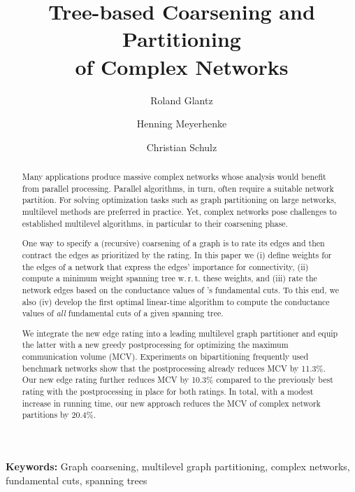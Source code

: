\documentclass[pdftex]{llncs}
\newcommand{\wrt}{w.\,r.\,t.\xspace}
\numberwithin{equation}{section}
\numberwithin{example}{section}
\numberwithin{table}{section}
\begin{document}
\date{}


\title{Tree-based Coarsening and Partitioning \\ of Complex Networks}


\author{Roland Glantz \and Henning Meyerhenke \and Christian Schulz}

\maketitle
\vspace{-4mm}
\begin{abstract}
Many applications produce massive complex networks whose
  analysis would benefit from parallel processing.  Parallel
  algorithms, in turn, often require a suitable network partition.  For solving optimization tasks such as
  graph partitioning on large networks, multilevel methods are
  preferred in practice. Yet, complex networks pose  challenges to
  established multilevel algorithms, in particular to their coarsening
  phase.  

One way to specify a (recursive) coarsening of a graph is to
  rate its edges and then contract the edges as prioritized by the
  rating.  In this paper we (i) define weights for the edges of a
  network that express the edges' importance for connectivity, (ii)
  compute a minimum weight spanning tree  \wrt these weights, and
  (iii) rate the network edges based on the conductance values of
  's fundamental cuts. To this end,  we also (iv) develop the first optimal
  linear-time algorithm to compute the conductance values of
  \emph{all} fundamental cuts of a given spanning tree.


We integrate the new edge rating into a leading multilevel graph
  partitioner and equip the latter with a new greedy postprocessing
  for optimizing the maximum communication volume (MCV).  Experiments
  on bipartitioning frequently used benchmark networks show that the
  postprocessing already reduces MCV by 11.3\%. Our new edge rating
  further reduces MCV by 10.3\% compared to the previously best rating
  with the postprocessing in place for both ratings. In total, with a
  modest increase in running time, our new approach reduces the MCV of
  complex network partitions by 20.4\%.
\end{abstract}
\vspace{-4mm}

\textbf{Keywords:} Graph coarsening, multilevel graph partitioning, complex networks, 
fundamental cuts, spanning trees
\end{document}
